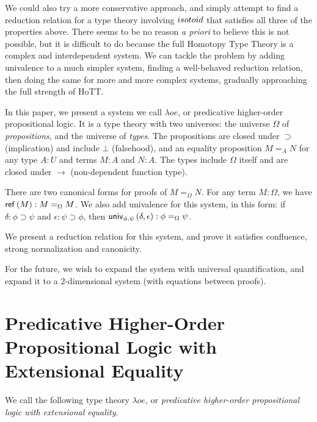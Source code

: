 We could also try a more conservative approach, and simply attempt to find a reduction relation for a type theory involving $isotoid$ that satisfies
all three of the properties above.  There seems to be no reason \emph{a priori} to believe this is not possible, but it is difficult to do because
the full Homotopy Type Theory is a complex and interdependent system.  We can tackle the problem by adding univalence to a much simpler system, finding
a well-behaved reduction relation, then doing the same for more and more complex systems, gradually approaching the full strength of HoTT.

In this paper, we present a system we call $\lambda o e$, or predicative higher-order propositional logic.  It is a type theory with two universes: the universe $\Omega$
of \emph{propositions}, and the universe of \emph{types}.  The propositions are closed under $\supset$ (implication) and include $\bot$ (falsehood), and an equality proposition $M =_A N$ for
any type $A : U$ and terms $M : A$ and $N : A$.  The types include $\Omega$ itself and are closed under $\rightarrow$ (non-dependent function type).

There are two canonical forms for proofs of $M =_\Omega N$.  For any term $M : \Omega$, we have $\mathsf{ref} \left( {M} \right) : M =_\Omega M$.  We also add univalence for this system, in this form:
if $\delta : \phi \supset \psi$ and $\epsilon : \psi \supset\phi$, then $\mathsf{univ}_{{\phi} , {\psi}} \left( {\delta} , {\epsilon} \right) : \phi =_\Omega \psi$.  

We present a reduction relation for this system, and prove it satisfies confluence, strong normalization and canonicity. 

For the future, we wish to expand the system with universal quantification, and expand it to a 2-dimensional system (with equations between proofs).


\section{Predicative Higher-Order Propositional Logic with Extensional Equality}

We call the following type theory $\lambda o e$, or \emph{predicative higher-order propositional logic with extensional equality}.  







